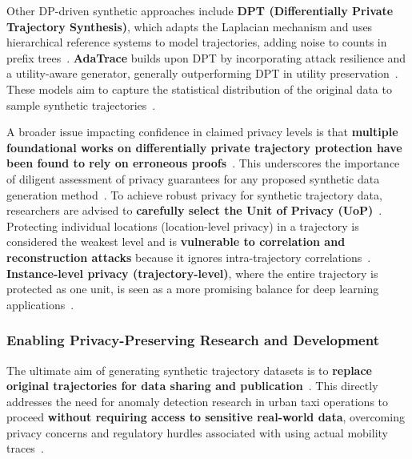 \documentclass[runningheads]{llncs}
\begin{document}
Other DP-driven synthetic approaches include \textbf{DPT (Differentially Private Trajectory Synthesis)}, which adapts the Laplacian mechanism and uses hierarchical reference systems to model trajectories, adding noise to counts in prefix trees~\cite{Chen2011DPTP,Jin2023SurveyExpStudy}. \textbf{AdaTrace} builds upon DPT by incorporating attack resilience and a utility-aware generator, generally outperforming DPT in utility preservation~\cite{Jin2023SurveyExpStudy}. These models aim to capture the statistical distribution of the original data to sample synthetic trajectories~\cite{Jin2023SurveyExpStudy,Qu2020GANs5G}.

A broader issue impacting confidence in claimed privacy levels is that \textbf{multiple foundational works on differentially private trajectory protection have been found to rely on erroneous proofs}~\cite{Buchholz2024SoK,Primault2014DPLPP,Errounda2019AnalysisDPLocation}. This underscores the importance of diligent assessment of privacy guarantees for any proposed synthetic data generation method~\cite{Buchholz2024SoK}. To achieve robust privacy for synthetic trajectory data, researchers are advised to \textbf{carefully select the Unit of Privacy (UoP)}~\cite{Buchholz2024SoK,Primault2019LongRoad}. Protecting individual locations (location-level privacy) in a trajectory is considered the weakest level and is \textbf{vulnerable to correlation and reconstruction attacks} because it ignores intra-trajectory correlations~\cite{Buchholz2024SoK,Buchholz2022RAoPT,Primault2014DPLPP,Errounda2019AnalysisDPLocation}. \textbf{Instance-level privacy (trajectory-level)}, where the entire trajectory is protected as one unit, is seen as a more promising balance for deep learning applications~\cite{Buchholz2024SoK}.

\subsubsection{Enabling Privacy-Preserving Research and Development}

The ultimate aim of generating synthetic trajectory datasets is to \textbf{replace original trajectories for data sharing and publication}~\cite{Buchholz2024SoK,Rao2021LSTMTrajGAN,Liu2018TrajGANs}. This directly addresses the need for anomaly detection research in urban taxi operations to proceed \textbf{without requiring access to sensitive real-world data}, overcoming privacy concerns and regulatory hurdles associated with using actual mobility traces~\cite{Buchholz2024SoK,Rao2021LSTMTrajGAN,Liu2018TrajGANs}.
\end{document}
